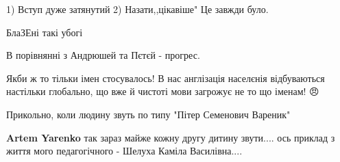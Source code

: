 \begin{itemize}
1) Вступ дуже затянутий
2) Назати,,цікавіше"
Це завжди було.

 
БлаЗЕні такі убогі

 
В порівнянні з Андрюшей та Пєтєй - прогрес.

 

Якби ж то тільки імен стосувалось! В нас англізація населєнія відбуваються
настільки глобально, що вже й чистоті мови загрожує не то що іменам! 😠


 

Прикольно, коли людину звуть по типу "Пітер Семенович Вареник"\Smiley[1.0][yellow]

\begin{itemize}
 
\textbf{Artem Yarenko} так зараз майже кожну другу дитину звути.... ось приклад з життя мого педагогічного - Шелуха Каміла Василівна....

 

\end{itemize}
\end{itemize}

